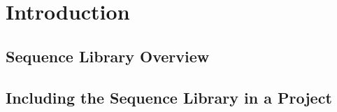 \section{Introduction} %
\label{sec:Introduction}

\subsection{Sequence Library Overview} %
\label{sub:Sequence Library Overview}


\subsection{Including the Sequence Library in a Project} %
\label{sub:Including the Sequence Library in a Project}


